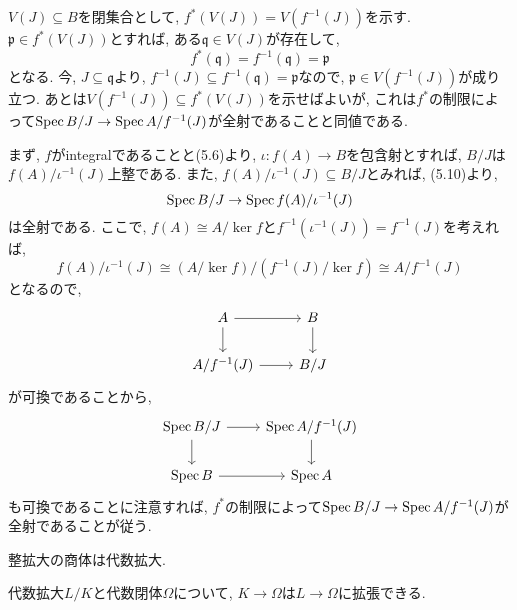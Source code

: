 \documentclass[dvipdfmx]{jsarticle}
\begin{document}
    \begin{problem}
        $V(J) \subseteq B$を閉集合として, $f^\ast(V(J)) = V(f^{-1}(J))$を示す.
        $\mathfrak{p} \in f^{\ast}(V(J))$とすれば, ある$\mathfrak{q} \in V(J)$が存在して,
        \[
            f^{\ast}(\mathfrak{q}) = f^{-1}(\mathfrak{q}) = \mathfrak{p}
        \]
        となる.
        今, $J \subseteq \mathfrak{q}$より, $f^{-1}(J) \subseteq f^{-1}(\mathfrak{q}) = \mathfrak{p}$なので,
        $\mathfrak{p} \in V(f^{-1}(J))$が成り立つ.
        あとは$V(f^{-1}(J)) \subseteq f^{\ast}(V(J))$を示せばよいが,
        これは$f^{\ast}$の制限によって$\operatorname{Spec}{B/J} \to \operatorname{Spec}{A/f^{-1}(J)}$が全射であることと同値である.

        まず, $f$がintegralであることと(5.6)より, $\iota: f(A) \to B$を包含射とすれば,
        $B/J$は$f(A)/\iota^{-1}(J)$上整である.
        また, $f(A)/\iota^{-1}(J) \subseteq B/J$とみれば, (5.10)より,
        \[
            \operatorname{Spec}{B/J} \to \operatorname{Spec}{f(A)/\iota^{-1}(J)}
        \]
        は全射である.
        ここで, $f(A) \cong A/\ker{f}$と$f^{-1}(\iota^{-1}(J)) = f^{-1}(J)$を考えれば,
        \[
            f(A)/\iota^{-1}(J) \cong (A/\ker{f})/(f^{-1}(J)/\ker{f}) \cong A/f^{-1}(J)
        \]
        となるので,
        \[
            \begin{tikzcd}
                A \arrow[r]\arrow[d] & B  \arrow[d] \\
                A/f^{-1}(J) \arrow[r] &  B/J
            \end{tikzcd}
        \]
        が可換であることから,
        \[
            \begin{tikzcd}
                \Spec{B/J} \arrow[r]\arrow[d] & \Spec{A/f^{-1}(J)}   \arrow[d] \\
                \Spec{B} \arrow[r] & \Spec{A}
            \end{tikzcd}
        \]
        も可換であることに注意すれば,
        $f^{\ast}$の制限によって$\operatorname{Spec}{B/J} \to \operatorname{Spec}{A/f^{-1}(J)}$が全射であることが従う.
    \end{problem}

    \begin{lemma}
        整拡大の商体は代数拡大.
    \end{lemma}

    \begin{lemma}
        代数拡大$L/K$と代数閉体$\Omega$について, $K \to \Omega$は$L \to \Omega$に拡張できる.
    \end{lemma}
\end{document}
